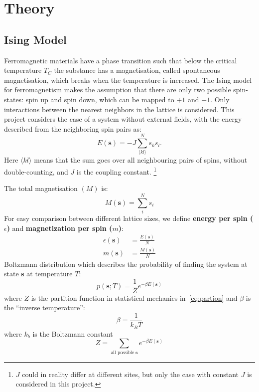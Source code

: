 \documentclass[english,notitlepage,reprint,nofootinbib]{revtex4-1}  %
\begin{document}

\section{Theory}\label{sec:theory}
%
\subsection{Ising Model}\label{sub:ising}
Ferromagnetic materials have a phase transition such that below the critical temperature $ T_C $ the substance has a magnetisation, called spontaneous magnetisation, which breaks when the temperature is increased. 
The Ising model for ferromagnetism makes the assumption that there are only two possible spin-states: spin up and spin down, which can be mapped to $ +1 $ and $ -1 $. Only interactions between the nearest neighbors in the lattice is considered. This project considers the case of a system without external fields, with the energy described from the neighboring spin pairs as:
\begin{equation}
	\label{eq:energy}
	 E(\mathbf{s}) = -J \sum\limits_{\langle kl \rangle}^{N} s_k s_l.
\end{equation}
Here $\langle kl \rangle$ means that the sum goes over all neighbouring pairs of spins, without double-counting, and $J$ is the coupling constant. \footnote{ $ J $ could in reality differ at different sites, but only the case with constant $J$ is considered in this project.}

The total magnetisation $ (M) $ is:
\begin{equation}
	\label{eq:magnetization}
	 M(\mathbf{s}) = \sum\limits_{i}^{N} s_i
\end{equation}
For easy comparison between different lattice sizes, we define \textbf{energy per spin ($\epsilon$)} and \textbf{magnetization per spin ($m$)}:
\begin{equation}
	\label{eq:energy-magnetization-per-spin}
	\begin{aligned}
		\epsilon(\mathbf{s}) &= \frac{E(\mathbf{s})}{N}\\[1ex]
  		m(\mathbf{s}) &= \frac{M(\mathbf{s})}{N}
	\end{aligned}
\end{equation}
Boltzmann distribution which describes the probability of finding the system at state $ \mathbf{s} $ at temperature $ T $:
\begin{equation}
	\label{eq:boltzmann}
	 p(\mathbf{s} ; T) = \frac{1}{Z} e^{-\beta E(\mathbf{s})}
\end{equation}
where $ Z $ is the partition function in statistical mechanics in~\ref{eq:partion} and $ \beta $  is the ``inverse temperature'':
\[ \beta = \frac{1}{k_B T} \] where $ k_b $ is the Boltzmann constant
\begin{equation}
	\label{eq:partion}
	 Z = \sum\limits_{\textrm{all possible}\;\mathbf{s}} e^{-\beta E(\mathbf{s})}
\end{equation}
\end{document}

